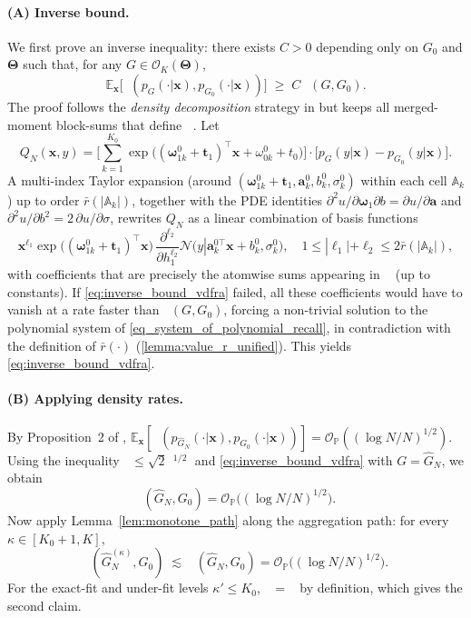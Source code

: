 \documentclass[twoside]{article}
\DeclareMathOperator*{\VDFRA}{D_{FRA}}
\DeclareMathOperator*{\VDE}{D_{E}}
\DeclareMathOperator*{\TV}{D_{TV}}
\DeclareMathOperator*{\hels}{D_{h}^2}
\theoremstyle{plain}
\theoremstyle{definition}
\theoremstyle{plain}
\def\rvx{{\mathbf{x}}}
\def\vTheta{{\bm{\Theta}}}
\def\vomega{{\bm{\omega}}}
\def\vell{{\bm{\ell}}}
\def\va{{\bm{a}}}
\def\vt{{\bm{t}}}
\def\vx{{\bm{x}}}
\def\sA{{\mathbb{A}}}
\def\sP{{\mathbb{P}}}
\newcommand{\bbE}{\mathbb{E}}
\newcommand{\cN}{\mathcal{N}}
\newcommand{\cO}{\mathcal{O}}
\begin{document}
\paragraph{(A) Inverse bound.}
We first prove an inverse inequality:
there exists \(C>0\) depending only on \(G_0\) and \(\vTheta\) such that, for any \(G\in\cO_K(\vTheta)\),
\begin{equation}\label{eq:inverse_bound_vdfra}
\bbE_\rvx\big[\TV(p_G(\cdot|\vx),p_{G_0}(\cdot|\vx))\big]\;\ge\; C\,\VDFRA(G,G_0).
\end{equation}
The proof follows the \emph{density decomposition} strategy in \citet{nguyen_demystifying_2023} but keeps all merged-moment block-sums that define \(\VDFRA\).
Let
\[
Q_N(\vx,y)=\Big[\textstyle\sum_{k=1}^{K_0}\exp\big((\vomega^0_{1k}+\vt_1)^\top \vx+\omega^0_{0k}+t_0\big)\Big]\cdot\big[p_G(y|\vx)-p_{G_0}(y|\vx)\big].
\]
A multi-index Taylor expansion (around \((\vomega_{1k}^0+\vt_1,\va_k^0,b_k^0,\sigma_k^0)\) within each cell \(\sA_k\)) up to order \(\bar r(|\sA_k|)\), together with the PDE identities
\(
\partial^2 u / \partial\vomega_1\partial b=\partial u/\partial\va\) and
\(\partial^2 u/\partial b^2 = 2\,\partial u/\partial\sigma
\),
rewrites \(Q_N\) as a linear combination of basis functions
\[
\vx^{\vell_1}\exp\!\big((\vomega_{1k}^0+\vt_1)^\top\vx\big)\,\frac{\partial^{\ell_2}}{\partial h_1^{\ell_2}}
\cN\!\big(y| \va_k^{0\top}\vx+b_k^0,\sigma_k^0\big),
\quad 1\le |\vell_1|+\ell_2\le2\bar r(|\sA_k|),
\]
with coefficients that are precisely the atomwise sums appearing in \(\VDFRA\) (up to constants).
If \cref{eq:inverse_bound_vdfra} failed, all these coefficients would have to vanish at a rate faster than \(\VDFRA(G,G_0)\), forcing a non-trivial solution to the polynomial system of \cref{eq_system_of_polynomial_recall}, in contradiction with the definition of \(\bar r(\cdot)\)
(\cref{lemma:value_r_unified}).
This yields \cref{eq:inverse_bound_vdfra}.

\paragraph{(B) Applying density rates.}
By Proposition~2 of \citet{nguyen_demystifying_2023},
\(
\bbE_\rvx[\hels(p_{\widehat G_N}(\cdot|\vx),p_{G_0}(\cdot|\vx))]
=\cO_\sP((\log N/N)^{1/2}).
\)
Using the inequality \(\TV\le \sqrt{2}\, \hels^{1/2}\) and \cref{eq:inverse_bound_vdfra} with \(G=\widehat G_N\), we obtain
\[
\VDFRA(\widehat G_N,G_0)=\cO_\sP\big((\log N/N)^{1/2}\big).
\]
Now apply Lemma~\ref{lem:monotone_path} along the aggregation path:
for every \(\kappa\in[K_0+1,K]\),
\[
\VDFRA(\widehat G_N^{(\kappa)},G_0)\;\lesssim\;\VDFRA(\widehat G_N,G_0)
=\cO_\sP\!\big((\log N/N)^{1/2}\big).
\]
For the exact-fit and under-fit levels \(\kappa'\le K_0\),
\(\VDFRA=\VDE\) by definition, which gives the second claim.
\end{document}
